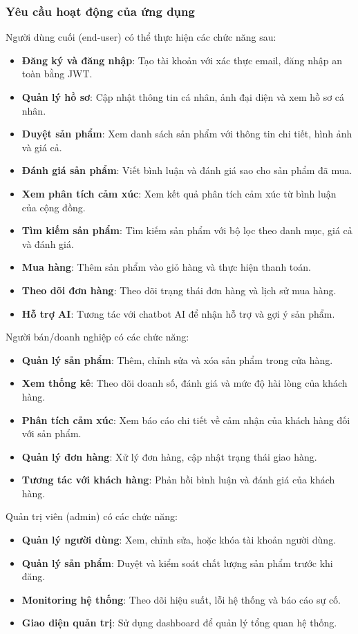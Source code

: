 \subsubsection{Yêu cầu hoạt động của ứng dụng}
Người dùng cuối (end-user) có thể thực hiện các chức năng sau:
\begin{itemize}
    \item \textbf{Đăng ký và đăng nhập}: Tạo tài khoản với xác thực email, đăng nhập an toàn bằng JWT.
    \item \textbf{Quản lý hồ sơ}: Cập nhật thông tin cá nhân, ảnh đại diện và xem hồ sơ cá nhân.
    \item \textbf{Duyệt sản phẩm}: Xem danh sách sản phẩm với thông tin chi tiết, hình ảnh và giá cả.
    \item \textbf{Đánh giá sản phẩm}: Viết bình luận và đánh giá sao cho sản phẩm đã mua.
    \item \textbf{Xem phân tích cảm xúc}: Xem kết quả phân tích cảm xúc từ bình luận của cộng đồng.
    \item \textbf{Tìm kiếm sản phẩm}: Tìm kiếm sản phẩm với bộ lọc theo danh mục, giá cả và đánh giá.
    \item \textbf{Mua hàng}: Thêm sản phẩm vào giỏ hàng và thực hiện thanh toán.
    \item \textbf{Theo dõi đơn hàng}: Theo dõi trạng thái đơn hàng và lịch sử mua hàng.
    \item \textbf{Hỗ trợ AI}: Tương tác với chatbot AI để nhận hỗ trợ và gợi ý sản phẩm.
\end{itemize}

Người bán/doanh nghiệp có các chức năng:
\begin{itemize}
    \item \textbf{Quản lý sản phẩm}: Thêm, chỉnh sửa và xóa sản phẩm trong cửa hàng.
    \item \textbf{Xem thống kê}: Theo dõi doanh số, đánh giá và mức độ hài lòng của khách hàng.
    \item \textbf{Phân tích cảm xúc}: Xem báo cáo chi tiết về cảm nhận của khách hàng đối với sản phẩm.
    \item \textbf{Quản lý đơn hàng}: Xử lý đơn hàng, cập nhật trạng thái giao hàng.
    \item \textbf{Tương tác với khách hàng}: Phản hồi bình luận và đánh giá của khách hàng.
\end{itemize}

Quản trị viên (admin) có các chức năng:
\begin{itemize}
    \item \textbf{Quản lý người dùng}: Xem, chỉnh sửa, hoặc khóa tài khoản người dùng.
    \item \textbf{Quản lý sản phẩm}: Duyệt và kiểm soát chất lượng sản phẩm trước khi đăng.
    \item \textbf{Monitoring hệ thống}: Theo dõi hiệu suất, lỗi hệ thống và báo cáo sự cố.
    \item \textbf{Giao diện quản trị}: Sử dụng dashboard để quản lý tổng quan hệ thống.
\end{itemize}

